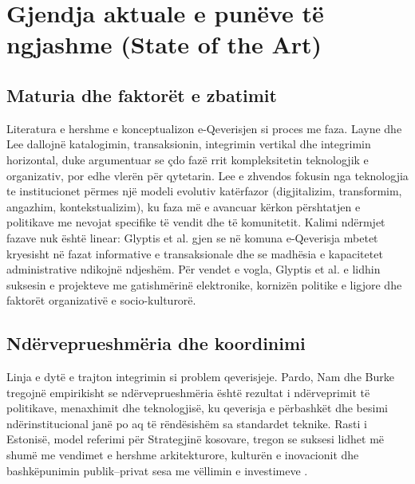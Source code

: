 \documentclass[conference]{IEEEtran}
\begin{document}
\section{Gjendja aktuale e punëve të ngjashme (State of the Art)}
\label{sec:sota}
\subsection{Maturia dhe faktorët e zbatimit}
Literatura e hershme e konceptualizon e-Qeverisjen si proces me faza. Layne
dhe Lee \cite{layne2001} dallojnë katalogimin, transaksionin, integrimin
vertikal dhe integrimin horizontal, duke argumentuar se çdo fazë rrit
kompleksitetin teknologjik e organizativ, por edhe vlerën për qytetarin.
Lee e zhvendos fokusin nga teknologjia te
institucionet përmes një modeli evolutiv katërfazor (digjitalizim,
transformim, angazhim, kontekstualizim), ku faza më e avancuar kërkon
përshtatjen e politikave me nevojat specifike të vendit dhe të komunitetit.
Kalimi ndërmjet fazave nuk është linear: Glyptis et al. gjen se në
komuna e-Qeverisja mbetet kryesisht në fazat informative e transaksionale
dhe se madhësia e kapacitetet administrative ndikojnë ndjeshëm. Për vendet
e vogla, Glyptis et al. \cite{glyptis2020} e lidhin suksesin e projekteve me
gatishmërinë elektronike, kornizën politike e ligjore dhe faktorët
organizativë e socio-kulturorë.

\subsection{Ndërveprueshmëria dhe koordinimi}
Linja e dytë e trajton integrimin si problem qeverisjeje. Pardo, Nam dhe
Burke \cite{pardo2012} tregojnë empirikisht se ndërveprueshmëria është
rezultat i ndërveprimit të politikave, menaxhimit dhe teknologjisë, ku
qeverisja e përbashkët dhe besimi ndërinstitucional janë po aq të
rëndësishëm sa standardet teknike. Rasti i Estonisë, model referimi për
Strategjinë kosovare, tregon se suksesi lidhet më shumë me vendimet e hershme
arkitekturore, kulturën e inovacionit dhe bashkëpunimin publik--privat sesa
me vëllimin e investimeve \cite{kalvet2012}.
\end{document}
